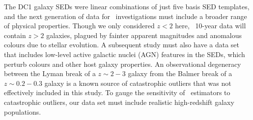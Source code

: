 The DC1 galaxy SEDs were linear combinations of just five basis SED templates, and the next generation of data for \pzpdf\ investigations must include a broader range of physical properties.
Though we only considered $z < 2$ here, \lsst\ 10-year data will contain $z > 2$ galaxies, plagued by fainter apparent magnitudes and anomalous colours due to stellar evolution.
A subsequent study must also have a data set that includes low-level active galactic nuclei (AGN) features in the SEDs, which perturb colours and other host galaxy properties.
An observational degeneracy between the Lyman break of a $z \sim 2-3$ galaxy from the Balmer break of a $z \sim 0.2-0.3$ galaxy is a known source of catastrophic outliers \citep{Massarotti:2001} that was not effectively included in this study.
To gauge the sensitivity of \pzpdf\ estimators to catastrophic outliers, our data set must include realistic high-redshift galaxy populations.

%


